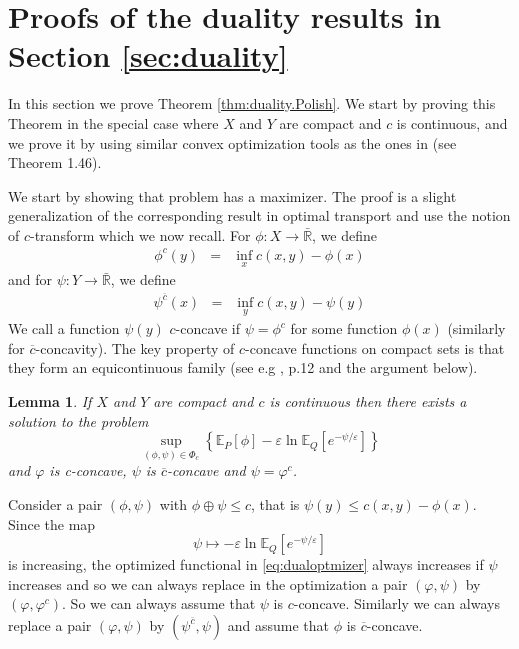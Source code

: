 \documentclass{amsart}
\newtheorem{lemma}[theorem]{Lemma}
\theoremstyle{definition}
\theoremstyle{remark}
\numberwithin{equation}{section}
\begin{document}
\section{Proofs of the duality results 
in Section \ref{sec:duality}}
\label{sec:proofs.duality}

In this section we prove Theorem \ref{thm:duality.Polish}.  We start by proving this Theorem in the special case where $X$ and $Y$ are compact and $c$ is continuous, and we prove it by using similar convex optimization tools as the ones in \cite{Santambrogio} (see Theorem 1.46). 

We start by showing that  problem has a maximizer.  The proof is a slight generalization of the corresponding result in optimal transport and use the notion of $c$-transform which we now recall.  For $\phi:X\to\bar{\mathbb{R}}$, we define
\begin{eqnarray}
\phi^c(y) &=& \inf_{x} c(x,y) - \phi(x) 
\end{eqnarray}
 and for $\psi:Y\to\bar{\mathbb{R}}$, we define
\begin{eqnarray}
\psi^{\overline{c}}(x)&=&\inf_{y} c(x,y) - \psi(y)
\end{eqnarray}
We call a function $\psi(y)$ $c$-concave if $\psi=\phi^c$ for some function $\phi(x)$ (similarly for $\overline{c}$-concavity). The key property of $c$-concave functions on compact sets is that they form an equicontinuous family (see e.g \cite{Santambrogio}, p.12 and the argument below). 


\begin{lemma}\label{lem:maxDP}
If $X$ and $Y$ are compact and $c$ is continuous then there exists a solution to the problem 
\begin{equation}\label{eq:dualoptmizer}
\sup_{(\phi, \psi) \in \Phi_c} \left\{ \mathbb{E}_P[\phi] - \varepsilon \ln \mathbb{E}_Q[ e^{-\psi/\varepsilon}] \right\}
\end{equation}
and $\varphi$ is c-concave, $\psi$ is $\overline{c}$-concave and $\psi=\varphi^c$. 
\end{lemma}

\proof  Consider a pair $(\phi, \psi)$ with $\phi\oplus\psi \le c$, that is $\psi(y) \le c(x,y)-\phi(x)$. Since the map 
$$
\psi  \mapsto  - \varepsilon \ln \mathbb{E}_Q[ e^{-\psi/\varepsilon}] 
$$
is increasing, the optimized functional in \eqref{eq:dualoptmizer}
always increases if $\psi$ increases and so we can always replace in the optimization  a pair $(\varphi, \psi)$ by $(\varphi, \varphi^c)$.  So we can always assume that $\psi$ is $c$-concave.  Similarly we can always replace a pair $(\varphi, \psi)$ by $(\psi^{\overline{c}}, \psi)$ and assume that $\phi$ is $\overline{c}$-concave. 
\end{document}
